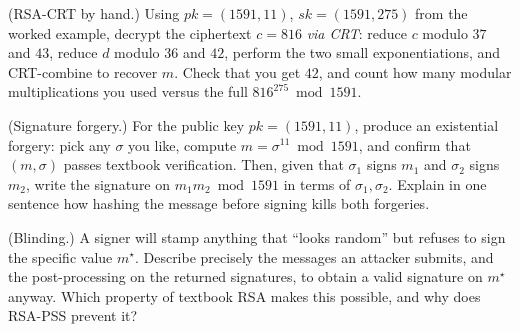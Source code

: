 \begin{exercise}
(RSA-CRT by hand.) Using $pk=(1591,11)$, $sk=(1591,275)$ from the worked example, decrypt the ciphertext $c=816$ \emph{via CRT}: reduce $c$ modulo $37$ and $43$, reduce $d$ modulo $36$ and $42$, perform the two small exponentiations, and CRT-combine to recover $m$. Check that you get $42$, and count how many modular multiplications you used versus the full $816^{275}\bmod 1591$.
\end{exercise}

\begin{exercise}
(Signature forgery.) For the public key $pk=(1591,11)$, produce an existential forgery: pick any $\sigma$ you like, compute $m=\sigma^{11}\bmod 1591$, and confirm that $(m,\sigma)$ passes textbook verification. Then, given that $\sigma_1$ signs $m_1$ and $\sigma_2$ signs $m_2$, write the signature on $m_1 m_2 \bmod 1591$ in terms of $\sigma_1,\sigma_2$. Explain in one sentence how hashing the message before signing kills both forgeries.
\end{exercise}

\begin{exercise}
(Blinding.) A signer will stamp anything that ``looks random'' but refuses to sign the specific value $m^\star$. Describe precisely the messages an attacker submits, and the post-processing on the returned signatures, to obtain a valid signature on $m^\star$ anyway. Which property of textbook RSA makes this possible, and why does RSA-PSS prevent it?
\end{exercise}
